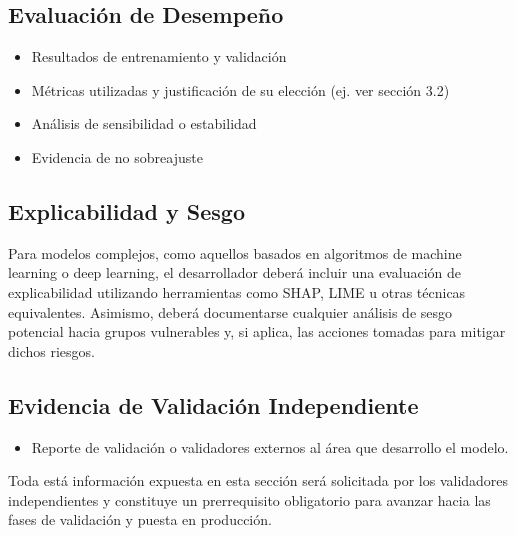 \documentclass[11pt,oneside]{article}%
\begin{document}
\subsection{Evaluación de Desempeño}
\begin{itemize}
\item Resultados de entrenamiento y validación 
\item Métricas utilizadas y justificación de su elección (ej. ver sección 3.2)
\item Análisis de sensibilidad o estabilidad
\item Evidencia de no sobreajuste
\end{itemize}

\subsection{Explicabilidad y Sesgo}

Para modelos complejos, como aquellos basados en algoritmos de machine learning o deep learning, el desarrollador deberá incluir una evaluación de explicabilidad utilizando herramientas como SHAP, LIME u otras técnicas equivalentes. Asimismo, deberá documentarse cualquier análisis de sesgo potencial hacia grupos vulnerables y, si aplica, las acciones tomadas para mitigar dichos riesgos.\\

\subsection{Evidencia de Validación Independiente}

\begin{itemize}
\item Reporte de validación o validadores externos al área que desarrollo el modelo. 
\end{itemize}

Toda está información expuesta en esta sección será solicitada por los validadores independientes y constituye un prerrequisito obligatorio para avanzar hacia las fases de validación y puesta en producción. 
\newpage
\end{document}
